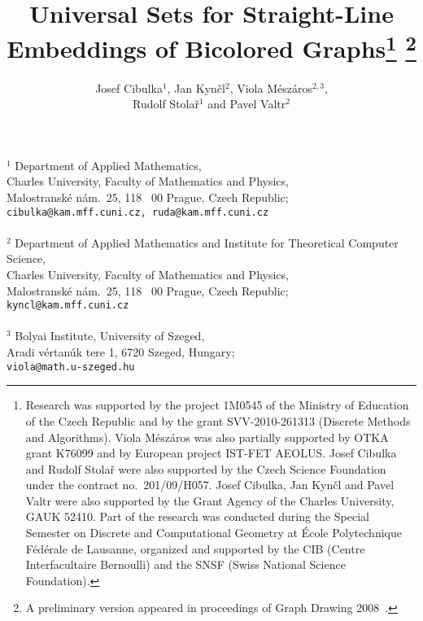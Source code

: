 \documentclass[12pt]{article}
\def\inst#1{$^{#1}$}
\begin{document}
\title{Universal Sets for Straight-Line Embeddings of Bicolored Graphs\thanks{
Research was supported by the project 1M0545 of the Ministry of Education of the Czech Republic 
and by the grant SVV-2010-261313 (Discrete Methods and Algorithms).
Viola M\'{e}sz\'{a}ros was also partially supported by OTKA grant K76099
and by European project IST-FET AEOLUS.
Josef Cibulka and Rudolf Stola\v{r} were also 
supported by the Czech Science Foundation under the contract no.\ 201/09/H057.
Josef Cibulka, Jan Kyn\v{c}l and Pavel Valtr were also supported by the Grant Agency 
of the Charles University, GAUK 52410.
\newline 
Part of the research was conducted during the Special Semester on Discrete
and Computational Geometry at \'Ecole Polytechnique F\'ed\'erale de Lausanne, organized and
supported by the CIB (Centre Interfacultaire Bernoulli) and the SNSF (Swiss
National Science Foundation).
} \thanks{A preliminary version appeared in 
proceedings of Graph Drawing 2008~\cite{gdversion}.}} 
\author{Josef Cibulka\inst{1}, Jan Kyn\v{c}l\inst{2}, Viola M\'{e}sz\'{a}ros\inst{2,3}, \\
Rudolf Stola\v{r}\inst{1} and Pavel Valtr\inst{2}
} 
\date{}

\maketitle

\begin{center}
{\footnotesize
\inst{1} 
Department of Applied Mathematics, \\
Charles University, Faculty of Mathematics and Physics, \\
Malostransk\'e n\'am.~25, 118~ 00 Prague, Czech Republic; \\ 
\texttt{cibulka@kam.mff.cuni.cz, ruda@kam.mff.cuni.cz} 
\\\ \\
\inst{2}
Department of Applied Mathematics and Institute for Theoretical Computer Science, \\
Charles University, Faculty of Mathematics and Physics, \\
Malostransk\'e n\'am.~25, 118~ 00 Prague, Czech Republic; \\
\texttt{kyncl@kam.mff.cuni.cz}
\\\ \\
\inst{3}
Bolyai Institute, University of Szeged, \\
Aradi v\'ertan\'uk tere 1, 6720 Szeged, Hungary; \\
\texttt{viola@math.u-szeged.hu}
}
\end{center}  
\end{document}

